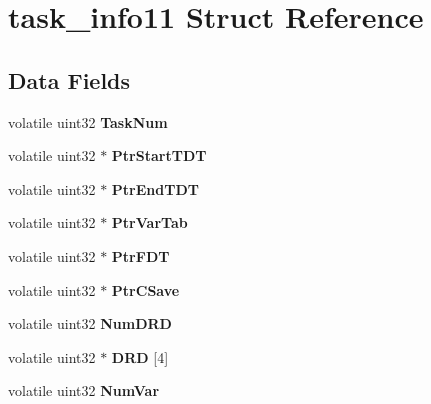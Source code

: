 \hypertarget{structtask__info11}{}\section{task\+\_\+info11 Struct Reference}
\label{structtask__info11}
\subsection*{Data Fields}
\begin{DoxyCompactItemize}
\item 
\mbox{\label{structtask__info11_af7cf654ca0b614fbe21d5747df081b2b}} 
volatile uint32 {\bfseries Task\+Num}
\item 
\mbox{\label{structtask__info11_a429dbff88b7626b251120e3d4919ddf7}} 
volatile uint32 $\ast$ {\bfseries Ptr\+Start\+T\+DT}
\item 
\mbox{\label{structtask__info11_abb7ab746e1c142372e5112b3c21621a4}} 
volatile uint32 $\ast$ {\bfseries Ptr\+End\+T\+DT}
\item 
\mbox{\label{structtask__info11_a612eedc77d7fdcb4a864d37fe0da1fff}} 
volatile uint32 $\ast$ {\bfseries Ptr\+Var\+Tab}
\item 
\mbox{\label{structtask__info11_a7140e0f760ac81a2f0ca3656a0d74e85}} 
volatile uint32 $\ast$ {\bfseries Ptr\+F\+DT}
\item 
\mbox{\label{structtask__info11_ac63c16439ef094d66e906038e6387ad1}} 
volatile uint32 $\ast$ {\bfseries Ptr\+C\+Save}
\item 
\mbox{\label{structtask__info11_a5653b2413cce5c25b7325eafaffd92a2}} 
volatile uint32 {\bfseries Num\+D\+RD}
\item 
\mbox{\label{structtask__info11_a348c7f4dec5bcd1d2257d2e91e01dccc}} 
volatile uint32 $\ast$ {\bfseries D\+RD} \mbox{[}4\mbox{]}
\item 
\mbox{\label{structtask__info11_aafc845b3e53be282dc99176263c35ca0}} 
volatile uint32 {\bfseries Num\+Var}

\end{DoxyCompactItemize}
